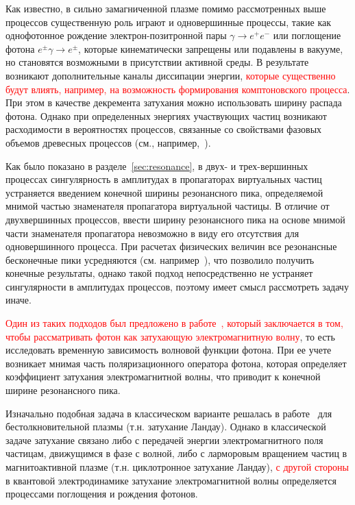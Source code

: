 
Как известно, в сильно замагниченной плазме помимо рассмотренных выше процессов существенную роль играют и одновершинные процессы, такие как однофотонное 
	рождение электрон-позитронной пары $\gamma\to e^+e^-$ или поглощение фотона 
	$e^{\pm}\gamma\to e^{\pm}$, которые кинематически запрещены или подавлены в 
	вакууме, но становятся возможными в присутствии активной среды. В результате возникают дополнительные каналы диссипации энергии, \textcolor{red}{которые существенно будут влиять, например, на возможность формирования комптоновского процесса}. При этом в качестве декремента затухания можно использовать ширину распада фотона. Однако при 
	определенных энергиях участвующих частиц возникают 
	расходимости в вероятностях процессов, связанные со свойствами фазовых объемов древесных процессов 
	(см., 
	например,~\cite{Klepikov:1954,Sturrock:1971,Tademaru:1973,Daugherty:1983,Shabad:1988}).
	
	Как было показано в разделе~\ref{sec:resonance}, в двух- 
	и трех-вершинных процессах сингулярность в амплитудах в пропагаторах 
	виртуальных частиц устраняется введением конечной ширины резонансного 
	пика, определяемой мнимой частью знаменателя пропагатора виртуальной частицы. В отличие от двухвершинных процессов, ввести ширину резонансного пика на основе 
	мнимой части знаменателя пропагатора невозможно в виду его отсутствия для 
	одновершинного процесса.  При расчетах 
	физических величин все резонансные бесконечные пики 
	усредняются (см. например~\cite{Baier:2007}), что позволило получить конечные результаты, 
	однако такой подход непосредственно не устраняет сингулярности в амплитудах процессов, поэтому имеет смысл рассмотреть задачу иначе.

\textcolor{red}{Один из таких подходов был предложено в работе~\cite{Shabad:1988}, который заключается в том, чтобы рассматривать фотон как затухающую электромагнитную волну}, то есть исследовать 
временную зависимость волновой функции фотона.
При ее учете возникает мнимая часть поляризационного оператора фотона, которая 
определяет коэффициент затухания электромагнитной волны, что приводит к 
конечной ширине резонансного пика.

Изначально подобная задача в классическом варианте решалась в работе~\cite{Landau:1946} для бестолкновительной плазмы (т.н. затухание Ландау). Однако в классической задаче затухание связано либо с 
передачей энергии электромагнитного поля частицам, движущимся в фазе с волной, 
либо с ларморовым вращением частиц в магнитоактивной плазме (т.н. циклотронное затухание Ландау), \textcolor{red}{с другой стороны} в квантовой электродинамике затухание 
электромагнитной волны определяется процессами 
поглощения и рождения фотонов.

